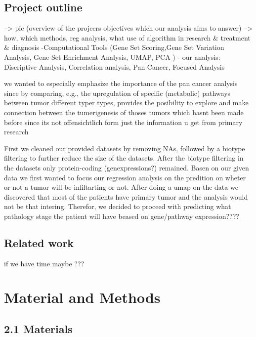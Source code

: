 \documentclass[
  parskip,
  oneside]{scrreprt}
\begin{document}
\hypertarget{project-outline}{%
\section{Project outline}\label{project-outline}}

--\textgreater{} pic (overview of the projecrs objectives which our
analysis aims to answer) --\textgreater{} how, which methods, reg
analysis, what use of algorithm in research \& treatment \& diagnosis
-Computational Tools (Gene Set Scoring,Gene Set Variation Analysis, Gene
Set Enrichment Analysis, UMAP, PCA ) - our analysis: Discriptive
Analysis, Correlation analysis, Pan Cancer, Focused Analysis

we wanted to especially emphasize the importance of the pan cancer
analysis since by comparing, e.g., the upregulation of specific
(metabolic) pathways between tumor different typer types, provides the
posibility to explore and make connection between the tumerigenesis of
thoses tumors which hasnt been made before since its not offensichtlich
form just the information u get from primary research

First we cleaned our provided datasets by removing NAs, followed by a
biotype filtering to further reduce the size of the datasets. After the
biotype filtering in the datasets only protein-coding (genexpressions?)
remained. Basen on our given data we first wanted to focus our
regression analysis on the predition on wheter or not a tumor will be
infiltarting or not. After doing a umap on the data we discovered that
most of the patients have primary tumor and the analysis would not be
that intering. Therefor, we decided to proceed with predicting what
pathology stage the patient will have beased on gene/pathway
expression????

\hypertarget{related-work}{%
\section{Related work}\label{related-work}}

if we have time maybe ???

\hypertarget{material-and-methods}{%
\chapter{Material and Methods}\label{material-and-methods}}

\hypertarget{materials}{%
\section{2.1 Materials}\label{materials}}
\end{document}
